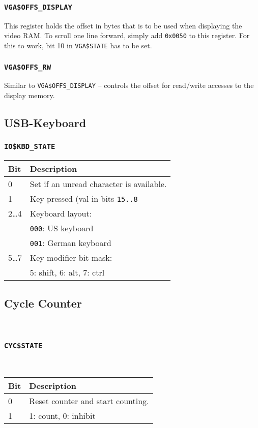 \documentclass{leaflet}
\begin{document}
   \subsubsection{\texttt{VGA\$OFFS\_DISPLAY}}
    This register holds the offset in bytes that is to be used when displaying
    the video RAM. To scroll one line forward, simply add \texttt{0x0050} to 
    this register. For this to work, bit 10 in \texttt{VGA\$STATE} has to be
    set.
\vspace*{-5mm}
   \subsubsection{\texttt{VGA\$OFFS\_RW}}
    Similar to \texttt{VGA\$OFFS\_DISPLAY} -- controls the offset for 
    read/write accesses to the display memory.
  \subsection{USB-Keyboard}
   \subsubsection{\texttt{IO\$KBD\_STATE}}
    \begin{center}
     \vspace*{-3mm}
     \begin{longtable}{|l|l|}
      \hline
       Bit&Description\\
      \hline
      \hline
       0&Set if an unread character is available.\\
       1&Key pressed (val in bits \texttt{15..8}\\
       2\dots 4&Keyboard layout:\\
        &\texttt{000}: US keyboard\\
        &\texttt{001}: German keyboard\\
       5\dots 7&Key modifier bit mask:\\
        &5: shift, 6: alt, 7: ctrl\\
      \hline
     \end{longtable}
    \end{center}
    \vspace*{-14mm}
   \subsection{Cycle Counter}
~\vspace*{-10mm}
    \subsubsection{\texttt{CYC\$STATE}}
~\vspace*{-3mm}
     \begin{center}
      \begin{longtable}{|l|l|}
       \hline
        Bit&Description\\
       \hline
       \hline
        0&Reset counter and start counting.\\
        1&1: count, 0: inhibit\\
       \hline
      \end{longtable}
     \end{center}
     \vspace*{-14mm}
%
\end{document}
